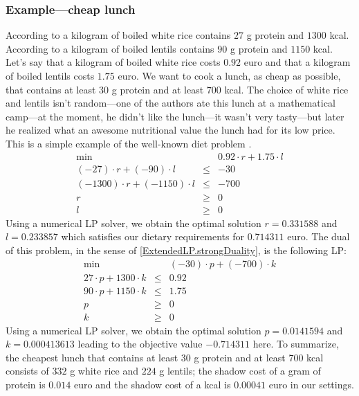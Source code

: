 \documentclass[]{article}
\renewcommand{\.}{\hskip .75pt}
\begin{document}
\subsubsection{Example\:---\:cheap lunch}

According to \cite{NutriRice} a kilogram of boiled white rice contains $27$ g protein and $1300$ kcal.
According to \cite{NutriLentils} a kilogram of boiled lentils contains $90$ g protein and $1150$ kcal.
Let's say that a kilogram of boiled white rice costs $0.92$ euro and that
a kilogram of boiled lentils costs $1.75$ euro.
We want to cook a lunch, as cheap as possible, that contains at least
$30$ g protein and at least $700$ kcal.
The choice of white rice and lentils isn't random\:---\:one of the authors
ate this lunch at a mathematical camp\:---\:at the moment, he didn't like the
lunch\:---\:it wasn't very tasty\:---\:but later he realized what an awesome nutritional
value the lunch had for its low price.
This is a simple example of the well-known diet problem \cite{Dantzig}.
$$
\begin{array}{rcl}
\min && 0.92 \cdot r + 1.75 \cdot l \\
(-27) \cdot r + (-90) \cdot l &\le& - 30 \\
(-1300) \cdot r + (-1150) \cdot l &\le& - 700 \\
r &\ge& 0  \\
l &\ge& 0 
\end{array}
$$
Using a numerical LP solver, we obtain the optimal solution
$r=0.331588$ and $l=0.233857$ which satisfies our dietary requirements for
$0.714311$ euro.
The dual of this problem, in the sense of \ref{ExtendedLP.strongDuality}, is the following LP:
$$
\begin{array}{rcl}
\min && (-30) \cdot p + (-700) \cdot k \\
27 \cdot p + 1300 \cdot k &\le& 0.92 \\
 90 \cdot p + 1150 \cdot k &\le& 1.75 \\
p &\ge& 0  \\
k &\ge& 0 
\end{array}
$$
Using a numerical LP solver, we obtain the optimal solution
$p=0.0141594$ and $k=0.000413613$ leading to the
objective value $-0.714311$ here.
To summarize, the cheapest lunch that contains at least
30 g protein and at least 700 kcal consists of $332$ g white rice
and $224$ g lentils; the shadow cost of a gram of protein is
$0.014$ euro and the shadow cost of a kcal is $0.00041$ euro
in our settings.
\end{document}
